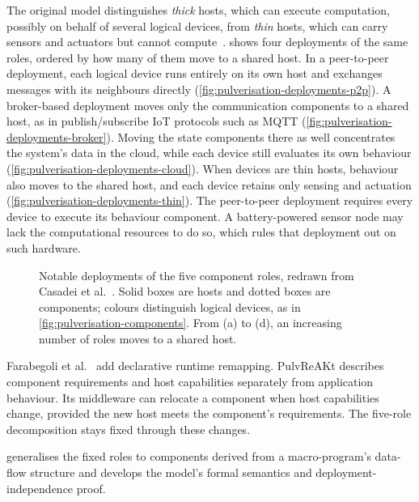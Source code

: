 The original model distinguishes \emph{thick} hosts, which can execute computation,
possibly on behalf of several logical devices,
from \emph{thin} hosts, which can carry sensors and actuators but cannot compute~\cite{DBLP:journals/fi/CasadeiPPVW20}.
%
 shows four deployments of the same roles,
ordered by how many of them move to a shared host.
In a peer-to-peer deployment,
each logical device runs entirely on its own host and exchanges messages with its neighbours directly (\cref{fig:pulverisation-deployments-p2p}).
A broker-based deployment moves only the communication components to a shared host,
as in publish/subscribe \ac{IoT} protocols such as MQTT (\cref{fig:pulverisation-deployments-broker}).
%
Moving the state components there as well concentrates the system's data in the cloud,
while each device still evaluates its own behaviour (\cref{fig:pulverisation-deployments-cloud}).
When devices are thin hosts,
behaviour also moves to the shared host,
and each device retains only sensing and actuation (\cref{fig:pulverisation-deployments-thin}).
%
The peer-to-peer deployment requires every device to execute its behaviour component.
A battery-powered sensor node may lack the computational resources to do so,
which rules that deployment out on such hardware.

\begin{figure}[tbp]
    \centering
    
    \caption[Notable deployments of the five component roles]{Notable deployments of the five component roles, redrawn from Casadei et al.~\cite{DBLP:journals/fi/CasadeiPPVW20}. Solid boxes are hosts and dotted boxes are components; colours distinguish logical devices, as in \cref{fig:pulverisation-components}. From (a) to (d), an increasing number of roles moves to a shared host.}
    \label{fig:pulverisation-deployments}
\end{figure}

Farabegoli et al.~\cite{DBLP:journals/fgcs/FarabegoliPCV24} add declarative runtime remapping.
PulvReAKt describes component requirements and host capabilities separately from application behaviour.
Its middleware can relocate a component when host capabilities change,
provided the new host meets the component's requirements.
The five-role decomposition stays fixed through these changes.

 generalises the fixed roles to components derived from a macro-program's data-flow structure
and develops the model's formal semantics and deployment-independence proof.
